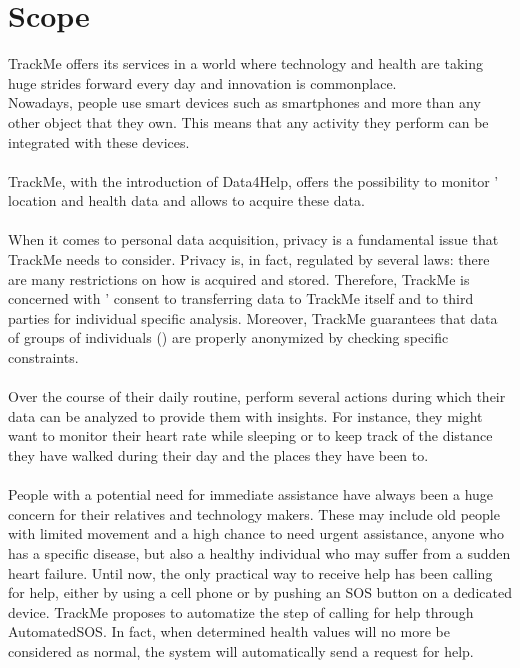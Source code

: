 \documentclass[../../rasd.tex]{subfiles}
\begin{document}
\section{Scope\label{sect:1.2}}
TrackMe offers its services in a world where technology and health are taking huge strides forward every day and innovation is commonplace.\\
Nowadays, people use smart devices such as smartphones and  more than any other object that they own. This means that any activity they perform can be integrated with these devices.\\\\
TrackMe, with the introduction of Data4Help, offers the possibility to monitor ’ location and health data and allows  to acquire these data.\\\\
When it comes to personal data acquisition, privacy is a fundamental issue that TrackMe needs to consider. Privacy is, in fact, regulated by several laws: there are many restrictions on how  is acquired and stored. Therefore, TrackMe is concerned with ’ consent to transferring data to TrackMe itself and to third parties for individual specific analysis. Moreover, TrackMe guarantees that data of groups of individuals () are properly anonymized by checking specific constraints.\\\\
Over the course of their daily routine,  perform several actions during which their data can be analyzed to provide them with insights. For instance, they might want to monitor their heart rate while sleeping or to keep track of the distance they have walked during their day and the places they have been to.\\\\
People with a potential need for immediate assistance have always been a huge concern for their relatives and technology makers. These may include old people with limited movement and a high chance to need urgent assistance, anyone who has a specific disease, but also a healthy individual who may suffer from a sudden heart failure. Until now, the only practical way to receive help has been calling for help, either by using a cell phone or by pushing an SOS button on a dedicated device. TrackMe proposes to automatize the step of calling for help through AutomatedSOS. In fact, when determined health values will no more be considered as normal, the system will automatically send a request for help.\\\\
\end{document}
